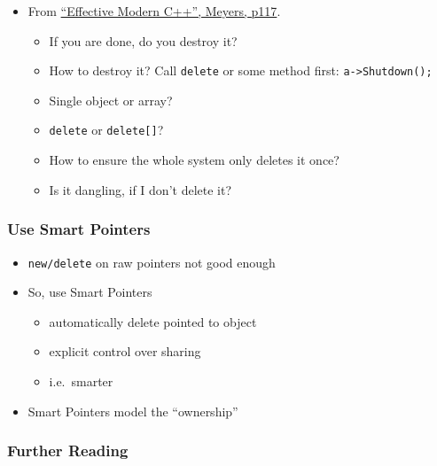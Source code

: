 \begin{itemize}
\itemsep1pt\parskip0pt
\item
  From
  \href{https://www.amazon.co.uk/Effective-Modern-Specific-Ways-Improve/dp/1491903996/ref=sr_1_1?ie=UTF8\&qid=1484571499\&sr=8-1\&keywords=Effective+Modern+C\%2B\%2B}{``Effective
  Modern C++'', Meyers, p117}.

  \begin{itemize}
  \itemsep1pt\parskip0pt
  \item
    If you are done, do you destroy it?
  \item
    How to destroy it? Call \texttt{delete} or some method first:
    \texttt{a-\textgreater{}Shutdown();}
  \item
    Single object or array?
  \item
    \texttt{delete} or \texttt{delete{[}{]}}?
  \item
    How to ensure the whole system only deletes it once?
  \item
    Is it dangling, if I don't delete it?
  \end{itemize}
\end{itemize}

\subsubsection{Use Smart Pointers}\label{use-smart-pointers}

\begin{itemize}
\itemsep1pt\parskip0pt
\item
  \texttt{new/delete} on raw pointers not good enough
\item
  So, use Smart Pointers

  \begin{itemize}
  \itemsep1pt\parskip0pt
  \item
    automatically delete pointed to object
  \item
    explicit control over sharing
  \item
    i.e.~smarter
  \end{itemize}
\item
  Smart Pointers model the ``ownership''
\end{itemize}

\subsubsection{Further Reading}\label{further-reading}

